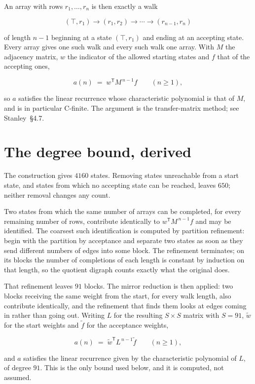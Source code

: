 \documentclass[11pt]{article}
\theoremstyle{definition}
\begin{document}
An array with rows $r_1,\dots,r_n$ is then exactly a walk

\[(\top,r_1) \to (r_1,r_2) \to \cdots \to (r_{n-1},r_n)\]

of length $n-1$ beginning at a state $(\top,r_1)$ and ending at an accepting state. Every array gives one such walk and every such walk one array. With $M$ the adjacency matrix, $w$ the indicator of the allowed starting states and $f$ that of the accepting ones,

\[a(n) \;=\; w^{\mathsf T} M^{\,n-1} f \qquad (n \ge 1),\]

so $a$ satisfies the linear recurrence whose characteristic polynomial is that of $M$, and is in particular C-finite. The argument is the transfer-matrix method; see Stanley~\S4.7.

\section{The degree bound, derived}

The construction gives $4160$ states. Removing states unreachable from a start state, and states from which no accepting state can be reached, leaves $650$; neither removal changes any count.

Two states from which the same number of arrays can be completed, for every remaining number of rows, contribute identically to $w^{\mathsf T}M^{\,n-1}f$ and may be identified. The coarsest such identification is computed by partition refinement: begin with the partition by acceptance and separate two states as soon as they send different numbers of edges into some block. The refinement terminates; on its blocks the number of completions of each length is constant by induction on that length, so the quotient digraph counts exactly what the original does.

That refinement leaves $91$ blocks. The mirror reduction is then applied: two blocks receiving the same weight from the start, for every walk length, also contribute identically, and the refinement that finds them looks at edges coming in rather than going out. Writing $L$ for the resulting $S \times S$ matrix with $S = 91$, $\tilde w$ for the start weights and $\tilde f$ for the acceptance weights,

\[a(n) \;=\; \tilde w^{\mathsf T} L^{\,n-1} \tilde f \qquad (n \ge 1),\]

and $a$ satisfies the linear recurrence given by the characteristic polynomial of $L$, of degree $91$. This is the only bound used below, and it is computed, not assumed.
\end{document}
